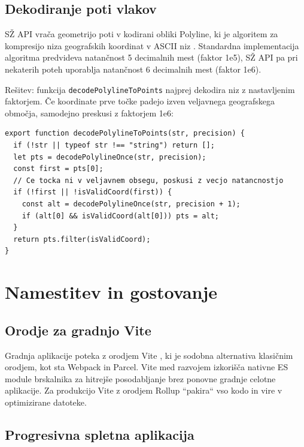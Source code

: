 \documentclass[12pt]{article}
\begin{document}
\subsection{Dekodiranje poti vlakov}

SŽ API vrača geometrijo poti v kodirani obliki Polyline, ki je algoritem za kompresijo niza geografskih koordinat v ASCII niz \cite{polyline}. Standardna implementacija algoritma predvideva natančnost 5 decimalnih mest (faktor 1e5), SŽ API pa pri nekaterih poteh uporablja natančnost 6 decimalnih mest (faktor 1e6).

Rešitev: funkcija \texttt{decodePolylineToPoints} najprej dekodira niz z nastavljenim faktorjem. Če koordinate prve točke padejo izven veljavnega geografskega območja, samodejno preskusi z faktorjem 1e6:

\begin{lstlisting}[caption={Samozaznavno dekodiranje Polyline-a z nastavljivo natančnostjo}, label={lst:poly}]
export function decodePolylineToPoints(str, precision) {
  if (!str || typeof str !== "string") return [];
  let pts = decodePolylineOnce(str, precision);
  const first = pts[0];
  // Ce tocka ni v veljavnem obsegu, poskusi z vecjo natancnostjo
  if (!first || !isValidCoord(first)) {
    const alt = decodePolylineOnce(str, precision + 1);
    if (alt[0] && isValidCoord(alt[0])) pts = alt;
  }
  return pts.filter(isValidCoord);
}
\end{lstlisting}

\section{Namestitev in gostovanje}

\subsection{Orodje za gradnjo Vite}

Gradnja aplikacije poteka z orodjem Vite \cite{vite}, ki je sodobna alternativa klasičnim orodjem, kot sta Webpack in Parcel. Vite med razvojem izkorišča nativne ES module brskalnika za hitrejše posodabljanje brez ponovne gradnje celotne aplikacije. Za produkcijo Vite z orodjem Rollup ``pakira`` vso kodo in vire v optimizirane datoteke.

\subsection{Progresivna spletna aplikacija}
\end{document}
